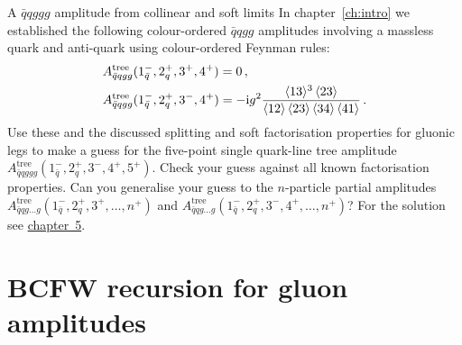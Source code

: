 \begin{exer}{A $\bar{q}qggg$ amplitude from collinear and soft limits}
\label{Ex:qqggg}
In chapter~\ref{ch:intro} we established the following colour-ordered $\bar{q}qgg$ amplitudes involving a massless quark and anti-quark using colour-ordered Feynman rules:
\begin{align} \label{eq:Aqqgg1}
& A_{\bar q q  gg}^{\text{tree}}(1^{-}_{\bar q}, 2^{+}_{q}, 3^{+},4^{+}) = 0 \,, \\
 \label{eq:Aqqgg2}
& A_{\bar q q  gg}^{\text{tree}}(1^{-}_{\bar q}, 2^{+}_{q}, 3^{-},4^{+}) = -\mathrm{i} g^{2}
\frac{\langle13\rangle^{3}\, \langle23\rangle}
{\langle12\rangle\,\langle23\rangle\,\langle34\rangle\, \langle41\rangle}\, .
\end{align}
Use these and the discussed splitting and soft factorisation properties for gluonic legs to make a guess for the five-point single quark-line tree amplitude $A^{\text{tree}}_{\bar{q}qggg}(1^{-}_{\bar{q}}, 2^+_q, 3^-, 4^+, 5^+)$. Check your guess against all known factorisation properties.
%
Can you generalise your guess to the $n$-particle partial amplitudes \break $A^{\text{tree}}_{\bar{q}qg\ldots g}(1^{-}_{\bar{q}}, 2^+_q, 3^+, \ldots, n^+)$ and 
$A^{\text{tree}}_{\bar{q}qg\ldots g}(1^{-}_{\bar{q}}, 2^+_q, 3^-, 4^+, \ldots, n^+)$?
For the solution see \hyperref[Sol:qqggg]{chapter~5}.
\end{exer}



\section{BCFW recursion for gluon amplitudes}
\label{sec:2.2}

